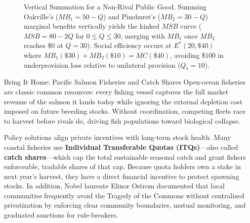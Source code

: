 \documentclass[11pt,letterpaper]{article}
\begin{document}
\begin{figure}[htbp]
\caption{Vertical Summation for a Non-Rival Public Good. Summing Oakville's ($MB_1 = 50 - Q$) and Pinehurst's ($MB_2 = 30 - Q$) marginal benefits vertically yields the kinked $MSB$ curve ($MSB = 80 - 2Q$ for $0 \le Q \le 30$, merging with $MB_1$ once $MB_2$ reaches $\$0$ at $Q = 30$). Social efficiency occurs at $E^*(20, \$40)$ where $MB_1 (\$30) + MB_2 (\$10) = MC (\$40)$, avoiding $\$100$ in underprovision loss relative to unilateral provision ($Q_1 = 10$).}
\label{fig:public_good_vertical_sum}
\end{figure}

\begin{examplecase}{Bring It Home: Pacific Salmon Fisheries and Catch Shares}
Open-ocean fisheries are classic common resources: every fishing vessel captures the full market revenue of the salmon it lands today while ignoring the external depletion cost imposed on future breeding stocks. Without coordination, competing fleets race to harvest before rivals do, driving fish populations toward biological collapse.

Policy solutions align private incentives with long-term stock health. Many coastal fisheries use \textbf{Individual Transferable Quotas (ITQs)}—also called \textbf{catch shares}—which cap the total sustainable seasonal catch and grant fishers enforceable, tradable shares of that cap. Because quota holders own a stake in next year's harvest, they have a direct financial incentive to protect spawning stocks. In addition, Nobel laureate Elinor Ostrom documented that local communities frequently avoid the Tragedy of the Commons without centralized privatization by enforcing clear community boundaries, mutual monitoring, and graduated sanctions for rule-breakers.
\end{examplecase}
\end{document}
